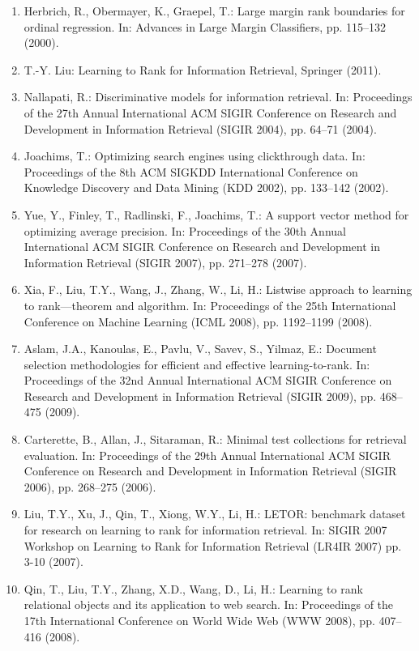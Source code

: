 \documentclass[12pt,a4paper,oneside]{article}
\begin{document}
\begin{enumerate}
	\item Herbrich, R., Obermayer, K., Graepel, T.: Large margin rank boundaries for ordinal regression. In: Advances in Large Margin Classifiers, pp. 115–132 (2000).
	\item T.-Y. Liu: Learning to Rank for Information Retrieval, Springer (2011).
	\item Nallapati, R.: Discriminative models for information retrieval. In: Proceedings of the 27th Annual International ACM SIGIR Conference on Research and Development in Information Retrieval (SIGIR 2004), pp. 64–71 (2004).
	\item Joachims, T.: Optimizing search engines using clickthrough data. In: Proceedings of the 8th ACM SIGKDD International Conference on Knowledge Discovery and Data Mining (KDD 2002), pp. 133–142 (2002).
	\item Yue, Y., Finley, T., Radlinski, F., Joachims, T.: A support vector method for optimizing average precision. In: Proceedings of the 30th Annual International ACM SIGIR Conference on Research and Development in Information Retrieval (SIGIR 2007), pp. 271–278 (2007).
	\item Xia, F., Liu, T.Y., Wang, J., Zhang, W., Li, H.: Listwise approach to learning to rank—theorem and algorithm. In: Proceedings of the 25th International Conference on Machine Learning (ICML 2008), pp. 1192–1199 (2008).
	\item Aslam, J.A., Kanoulas, E., Pavlu, V., Savev, S., Yilmaz, E.: Document selection methodologies for efficient and effective learning-to-rank. In: Proceedings of the 32nd Annual International ACM SIGIR Conference on Research and Development in Information Retrieval (SIGIR 2009), pp. 468–475 (2009).
	\item Carterette, B., Allan, J., Sitaraman, R.: Minimal test collections for retrieval evaluation. In: Proceedings of the 29th Annual International ACM SIGIR Conference on Research and Development in Information Retrieval (SIGIR 2006), pp. 268–275 (2006).
	\item Liu, T.Y., Xu, J., Qin, T., Xiong, W.Y., Li, H.: LETOR: benchmark dataset for research on learning to rank for information retrieval. In: SIGIR 2007 Workshop on Learning to Rank for Information Retrieval (LR4IR 2007) pp. 3-10 (2007).
	\item Qin, T., Liu, T.Y., Zhang, X.D., Wang, D., Li, H.: Learning to rank relational objects and its application to web search. In: Proceedings of the 17th International Conference on World Wide Web (WWW 2008), pp. 407–416 (2008).

\end{enumerate}
\end{document}
